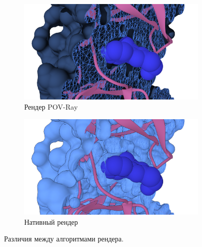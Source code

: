 \begin{figure}
\begin{subfigure}{\linewidth}
    \centering
    \includegraphics[width=\linewidth]{Guide/Figures/POV-render.png}
    \caption{Рендер POV-Ray}
    \label{fig:pov}
    \vspace{1em}
\end{subfigure}
\begin{subfigure}{\linewidth}
    \centering
    \includegraphics[width=\linewidth]{Guide/Figures/Chimera-render.png}
    \caption{Нативный рендер}
    \label{fig:chi}
\end{subfigure}
\caption{Различия между алгоритмами рендера.}
\label{fig:render}
\end{figure}\clearpage
